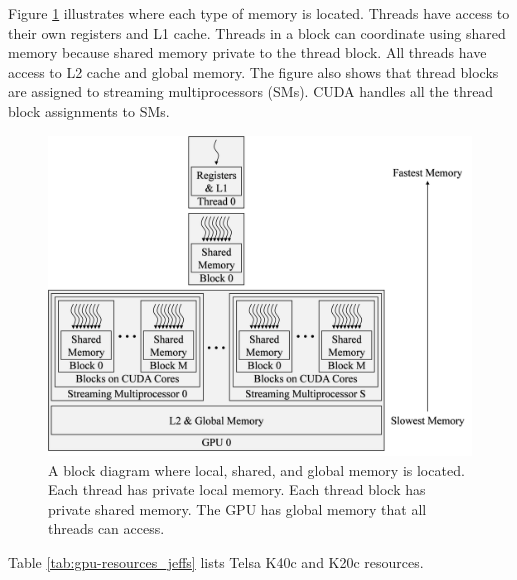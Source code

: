 Figure \ref{fig:fullGPUmemBlockDiagram} illustrates where each type of memory is located.
Threads have access to their own registers and L1 cache.
Threads in a block can coordinate using shared memory because shared memory private to the thread block.
All threads have access to L2 cache and global memory.
The figure also shows that thread blocks are assigned to streaming multiprocessors (SMs).
CUDA handles all the thread block assignments to SMs.
\begin{figure}
	\centering\includegraphics[width=9.83in/100*55]{figures/gpu_intro/fullGPUmemBlockDiagram.pdf}
	\caption{A block diagram where local, shared, and global memory is located. Each thread has private local memory. Each thread block has private shared memory. The GPU has global memory that all threads can access.}
	\label{fig:fullGPUmemBlockDiagram}
\end{figure}
Table \ref{tab:gpu-resources_jeffs} lists Telsa K40c and K20c resources.
